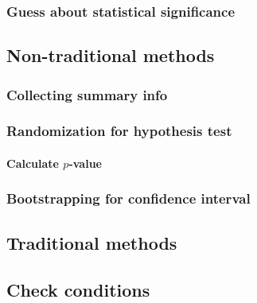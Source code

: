 \documentclass[12pt, krantz2,]{krantz}
\let\oldparagraph\paragraph
\renewcommand{\paragraph}[1]{\oldparagraph{#1}\mbox{}}
\begin{document}
\hypertarget{guess-about-statistical-significance-2}{%
\subsubsection*{Guess about statistical significance}\label{guess-about-statistical-significance-2}}


\hypertarget{non-traditional-methods-2}{%
\subsection{Non-traditional methods}\label{non-traditional-methods-2}}

\hypertarget{collecting-summary-info}{%
\subsubsection*{Collecting summary info}\label{collecting-summary-info}}


\hypertarget{randomization-for-hypothesis-test}{%
\subsubsection*{Randomization for hypothesis test}\label{randomization-for-hypothesis-test}}


\hypertarget{calculate-p-value-2}{%
\paragraph{\texorpdfstring{Calculate \(p\)-value}{Calculate p-value}}\label{calculate-p-value-2}}

\hypertarget{bootstrapping-for-confidence-interval-2}{%
\subsubsection*{Bootstrapping for confidence interval}\label{bootstrapping-for-confidence-interval-2}}


\hypertarget{traditional-methods-2}{%
\subsection{Traditional methods}\label{traditional-methods-2}}

\hypertarget{check-conditions-2}{%
\subsection{Check conditions}\label{check-conditions-2}}
\end{document}
